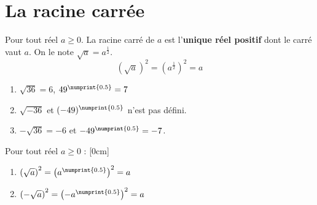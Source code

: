 %	 


%	 


\newpage 
{}  
\pagestyle{scrheadings} %
\onehalfspacing
\section{La racine carrée} 
\begin{definition} Pour tout réel $a\geqslant 0$. La \og racine carré de $a$ \fg{} est l'\textbf{unique réel positif}  dont le carré vaut $a$. On le note $\sqrt{a}=a^{\frac{1}{2}}$. 
	\[	
	\left(\sqrt{a}\right)^2=\left( a^{\frac{1}{2}} \right)^2 = a 
	\] 
\end{definition}  
\begin{example}\hfill 
	\begin{enumerate}[label=\alph*),leftmargin=*]
		\item  $\sqrt{36}=6 $, $49^{\numprint{0.5}}=7$
		\item  $\sqrt{-36}$ et $(-49)^{\numprint{0.5}}$ n'est pas défini.
		\item $-\sqrt{36} = -6$ et $-49^{\numprint{0.5}}=-7$. 
	\end{enumerate} 
\end{example} 
\begin{proposition}  Pour tout réel $a\geqslant 0$  :
	[0cm]
	\begin{enumerate}[label=\alph*),leftmargin=*]
		\item  $\left(\sqrt{a}\right)^2= \left(a^{\numprint{0.5}}\right)^2   = a $
		\item  $\left(-\sqrt{a}\right)^2= \left(-a^{\numprint{0.5}}\right)^2   = a $
	\end{enumerate}  
\end{proposition}
